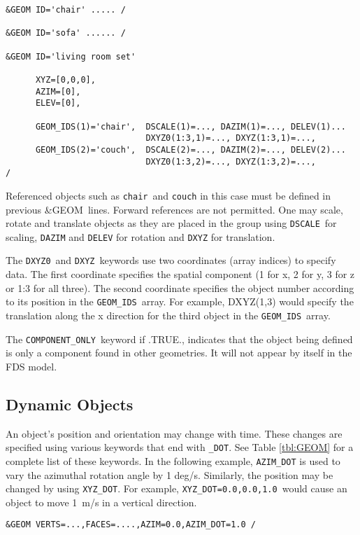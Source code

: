 \documentclass[12pt]{article}
\begin{document}
{%
\begin{verbatim}
&GEOM ID='chair' ..... /

&GEOM ID='sofa' ...... /

&GEOM ID='living room set'

      XYZ=[0,0,0],
      AZIM=[0],
      ELEV=[0],

      GEOM_IDS(1)='chair',  DSCALE(1)=..., DAZIM(1)=..., DELEV(1)...
                            DXYZ0(1:3,1)=..., DXYZ(1:3,1)=...,
      GEOM_IDS(2)='couch',  DSCALE(2)=..., DAZIM(2)=..., DELEV(2)...
                            DXYZ0(1:3,2)=..., DXYZ(1:3,2)=...,
/
\end{verbatim}
}

\noindent Referenced objects such as {\tt chair}\ and {\tt couch} in this case must be defined in
previous {\&GEOM}\ lines.  Forward references are not permitted.
One may scale, rotate and translate objects as they are placed in the group using
{\tt DSCALE}\, for scaling, {\tt DAZIM} and {\tt DELEV} for rotation and {\tt DXYZ} for translation.

The {\tt DXYZ0}\ and {\tt DXYZ}\ keywords use two coordinates (array indices) to specify data.
The first coordinate specifies the spatial component (1 for x, 2 for y, 3 for z or 1:3 for all three).
The second coordinate specifies the object number according to its position in the {\tt GEOM\_IDS}\ array.
For example,
DXYZ(1,3) would specify the translation along the x direction for the third object in the {\tt GEOM\_IDS}\ array.

The {\tt COMPONENT\_ONLY}\ keyword if .TRUE., indicates that the object being defined is only a component found in other geometries.
It will not appear by itself in the FDS model.

\subsection{Dynamic Objects}
An object's position and orientation may change with time.
These changes are specified using various keywords that end with {\tt \_DOT}.
See Table \ref{tbl:GEOM} for a complete list of these keywords.
In the following example, {\tt AZIM\_DOT} is used to vary the azimuthal rotation angle by 1 deg/s.
Similarly, the position may be changed by using {\tt XYZ\_DOT}.
For example, {\tt XYZ\_DOT=0.0,0.0,1.0}\ would cause an object to move 1~m/s in a vertical direction.
\begin{verbatim}
&GEOM VERTS=...,FACES=....,AZIM=0.0,AZIM_DOT=1.0 /
\end{verbatim}
\end{document}
